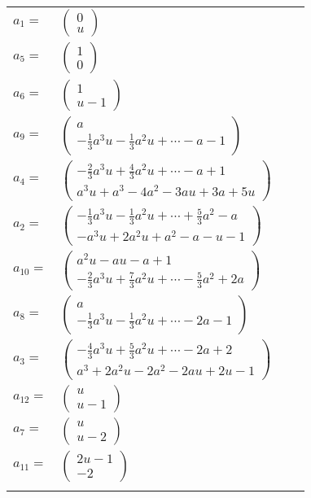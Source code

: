 \documentclass[1p]{elsarticle_modified}
\theoremstyle{definition}
\begin{document}
\begin{tabular}{m{7pt} m{180pt} m{7pt} m{180pt} }
\flushright $a_{1}=$&$\begin{pmatrix}0\\u\end{pmatrix}$ \\
\flushright $a_{5}=$&$\begin{pmatrix}1\\0\end{pmatrix}$ \\
\flushright $a_{6}=$&$\begin{pmatrix}1\\u-1\end{pmatrix}$ \\
\flushright $a_{9}=$&$\begin{pmatrix}a\\-\frac{1}{3} a^3 u-\frac{1}{3} a^2 u+\cdots- a-1\end{pmatrix}$ \\
\flushright $a_{4}=$&$\begin{pmatrix}-\frac{2}{3} a^3 u+\frac{4}{3} a^2 u+\cdots- a+1\\a^3 u+a^3-4 a^2-3 a u+3 a+5 u\end{pmatrix}$ \\
\flushright $a_{2}=$&$\begin{pmatrix}-\frac{1}{3} a^3 u-\frac{1}{3} a^2 u+\cdots+\frac{5}{3} a^2- a\\- a^3 u+2 a^2 u+a^2- a- u-1\end{pmatrix}$ \\
\flushright $a_{10}=$&$\begin{pmatrix}a^2 u- a u- a+1\\-\frac{2}{3} a^3 u+\frac{7}{3} a^2 u+\cdots-\frac{5}{3} a^2+2 a\end{pmatrix}$ \\
\flushright $a_{8}=$&$\begin{pmatrix}a\\-\frac{1}{3} a^3 u-\frac{1}{3} a^2 u+\cdots-2 a-1\end{pmatrix}$ \\
\flushright $a_{3}=$&$\begin{pmatrix}-\frac{4}{3} a^3 u+\frac{5}{3} a^2 u+\cdots-2 a+2\\a^3+2 a^2 u-2 a^2-2 a u+2 u-1\end{pmatrix}$ \\
\flushright $a_{12}=$&$\begin{pmatrix}u\\u-1\end{pmatrix}$ \\
\flushright $a_{7}=$&$\begin{pmatrix}u\\u-2\end{pmatrix}$ \\
\flushright $a_{11}=$&$\begin{pmatrix}2 u-1\\-2\end{pmatrix}$\\&\end{tabular}
\end{document}
